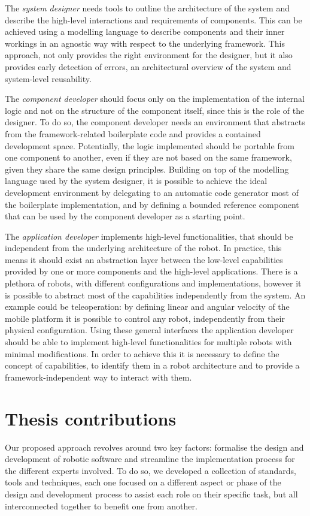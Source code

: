 The \textit{system designer} needs tools to outline the architecture of the system and describe the high-level interactions and requirements of components. This can be achieved using a modelling language to describe components and their inner workings in an agnostic way with respect to the underlying framework. This approach, not only provides the right environment for the designer, but it also provides early detection of errors, an architectural overview of the system and system-level reusability. 

The \textit{component developer} should focus only on the implementation of the internal logic and not on the structure of the component itself, since this is the role of the designer. To do so, the component developer needs an environment that abstracts from the framework-related boilerplate code and provides a contained development space. Potentially, the logic implemented should be portable from one component to another, even if they are not based on the same framework, given they share the same design principles. Building on top of the modelling language used by the system designer, it is possible to achieve the ideal development environment by delegating to an automatic code generator most of the boilerplate implementation, and by defining a bounded reference component that can be used by the component developer as a starting point.

The \textit{application developer} implements high-level functionalities, that should be independent from the underlying architecture of the robot. In practice, this means it should exist an abstraction layer between the low-level capabilities provided by one or more components and the high-level applications. There is a plethora of robots, with different configurations and implementations, however it is possible to abstract most of the capabilities independently from the system. An example could be teleoperation: by defining linear and angular velocity of the mobile platform it is possible to control any robot, independently from their physical configuration. Using these general interfaces the application developer should be able to implement high-level functionalities for multiple robots with minimal modifications. In order to achieve this it is necessary to define the concept of capabilities, to identify them in a robot architecture and to provide a framework-independent way to interact with them.

\section{Thesis contributions}
Our proposed approach revolves around two key factors: formalise the design and development of robotic software and streamline the implementation process for the different experts involved. To do so, we developed a collection of standards, tools and techniques, each one focused on a different aspect or phase of the design and development process to assist each role on their specific task, but all interconnected together to benefit one from another.

